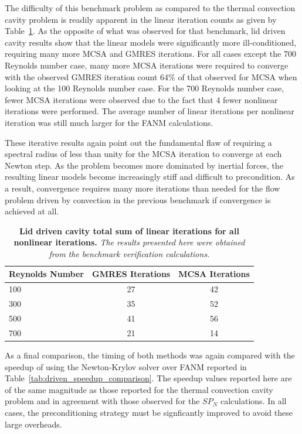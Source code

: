 The difficulty of this benchmark problem as compared to the thermal
convection cavity problem is readily apparent in the linear iteration
counts as given by Table~\ref{tab:driven_linear_iter_comparison}. As
the opposite of what was observed for that benchmark, lid driven
cavity results show that the linear models were significantly more
ill-conditioned, requiring many more MCSA and GMRES iterations. For
all cases except the 700 Reynolds number case, many more MCSA
iterations were required to converge with the observed GMRES iteration
count 64\% of that observed for MCSA when looking at the 100 Reynolds
number case. For the 700 Reynolds number case, fewer MCSA iterations
were observed due to the fact that 4 fewer nonlinear iterations were
performed. The average number of linear iterations per nonlinear
iteration was still much larger for the FANM calculations.

These iterative results again point out the fundamental flaw of
requiring a spectral radius of less than unity for the MCSA iteration
to converge at each Newton step. As the problem becomes more dominated
by inertial forces, the resulting linear models become increasingly
stiff and difficult to precondition. As a result, convergence requires
many more iterations than needed for the flow problem driven by
convection in the previous benchmark if convergence is achieved at
all.

\begin{table}[h!]
  \begin{center}
    \begin{tabular}{lcc}\hline\hline
      \multicolumn{1}{l}{Reynolds Number}& 
      \multicolumn{1}{c}{GMRES Iterations}&
      \multicolumn{1}{c}{MCSA Iterations}\\
      \hline
      100 & 27 & 42 \\
      300 & 35 & 52 \\
      500 & 41 & 56 \\
      700 & 21 & 14 \\
      \hline\hline
    \end{tabular}
  \end{center}
  \caption{\textbf{Lid driven cavity total sum of linear
      iterations for all nonlinear iterations.} \textit{The results
      presented here were obtained from the benchmark verification
      calculations.}}
  \label{tab:driven_linear_iter_comparison}
\end{table}

As a final comparison, the timing of both methods was again compared
with the speedup of using the Newton-Krylov solver over FANM reported
in Table~\ref{tab:driven_speedup_comparison}. The speedup values
reported here are of the same magnitude as those reported for the
thermal convection cavity problem and in agreement with those observed
for the $SP_N$ calculations. In all cases, the preconditioning
strategy must be signficantly improved to avoid these large overheads.

